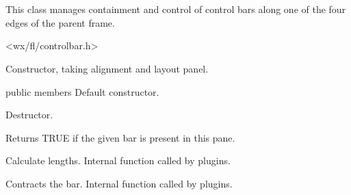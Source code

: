 %
%


\section{}\label{cbdockpane}


This class manages containment and control of control bars
along one of the four edges of the parent frame.




<wx/fl/controlbar.h>




\label{cbdockpanecbdockpane}


Constructor, taking alignment and layout panel.



public members Default constructor.


\label{cbdockpanedtor}


Destructor.


\label{cbdockpanebarpresent}


Returns TRUE if the given bar is present in this pane.


\label{cbdockpanecalclengthratios}


Calculate lengths.
Internal function called by plugins.


\label{cbdockpanecontractbar}


Contracts the bar.
Internal function called by plugins.


\label{cbdockpanedoinsertbar}

